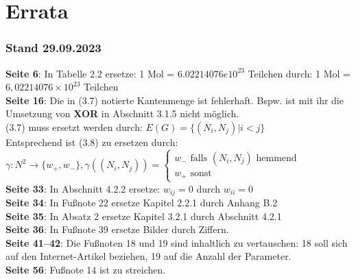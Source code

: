 \chapter*{Errata}

\subsection*{Stand 29.09.2023}

\textbf{Seite 6}: In Tabelle 2.2 ersetze: 1 Mol = $6.02214076e10^{23}$ Teilchen durch: 1 Mol = $6,02214076\times10^{23}$ Teilchen\\

\noindent
\textbf{Seite 16}:
Die in (3.7) notierte Kantenmenge ist fehlerhaft. Bspw. ist mit ihr die Umsetzung von \textbf{XOR} in Abschnitt 3.1.5 nicht möglich.\\

\noindent
(3.7) muss ersetzt werden durch: $E(G) = \{(N_i, N_j) | i < j\}$\\

\noindent
Entsprechend ist (3.8) zu ersetzen durch:\\

    $\gamma: N^2 \to \{w_+, w_-\}, \gamma((N_i, N_j)) = \begin{cases}
                                                                 w_- \text{ falls } (N_i, N_j)  \text{ hemmend } \\
                                                                 w_+  \text{ sonst}
    \end{cases}$\\


\noindent
\textbf{Seite 33}:
In Abschnitt 4.2.2 ersetze: $w_{ij} = 0$ durch $w_{ii} = 0$\\

\noindent
\textbf{Seite 34}:
In Fußnote 22 ersetze Kapitel 2.2.1 durch Anhang B.2\\

\noindent
\textbf{Seite 35}:
In Absatz 2 ersetze Kapitel 3.2.1 durch Abschnitt 4.2.1\\

\noindent
\textbf{Seite 36}:
In Fußnote 39 ersetze Bilder durch Ziffern.\\

\noindent
\textbf{Seite 41--42}:
Die Fußnoten 18 und 19 sind inhaltlich zu vertauschen: 18 soll sich auf den Internet-Artikel beziehen, 19 auf die Anzahl der Parameter.\\

\noindent
\textbf{Seite 56}:
Fußnote 14 ist zu streichen.\\